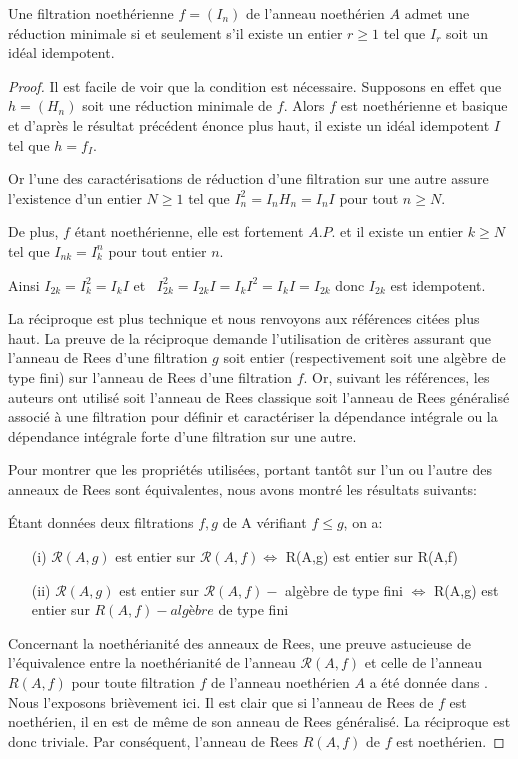 \begin{maproposition}
	Une filtration noethérienne $f=(I_{n})$ de l'anneau noethérien $A$
	admet une réduction minimale si et seulement s'il existe un entier $r\geq 1$ tel que $I_{r}$ soit un idéal idempotent.
\end{maproposition}
\begin{proof}
	Il est facile de voir que la condition est nécessaire. Supposons en effet que $h=(H_{n})$ soit une réduction minimale de $f$. Alors $f $ est noethérienne et basique et d'après le résultat précédent énonce plus haut, il existe un idéal idempotent $I$ tel que $h=f_{I}$. 
	
	Or l'une des caractérisations de réduction d'une filtration sur une
	autre assure l'existence d'un entier $N\geq 1$ tel que $I_{n}^{2}=I_{n}H_{n}=I_{n}I$ pour tout $n\geq N$. 
	
	De plus, $f$ étant noethérienne, elle est fortement $A.P.$ et il
	existe un entier $k\geq N$ tel que $I_{nk}=I_{k}^{n}$ pour tout entier $n$. 
	
	Ainsi $I_{2k}=I_{k}^{2}=I_{k}I$ et \ $I_{2k}^{2}=I_{2k}I=I_{k}I^{2}=I_{k}I=I_{2k}$ donc $I_{2k}$ est idempotent.
	
	La réciproque est plus technique et nous renvoyons aux références citées plus haut. La preuve de la réciproque demande
	l'utilisation de critères assurant que l'anneau de Rees d'une filtration $g$ soit entier (respectivement soit une algèbre de type fini) sur l'anneau de Rees d'une filtration $f.$ Or, suivant les références, les auteurs ont utilisé soit l'anneau de Rees classique soit l'anneau de Rees généralisé associé à une filtration pour définir et caractériser la dépendance intégrale ou la dépendance intégrale forte d'une filtration sur une autre. 
	
	Pour montrer que les propriétés utilisées, portant tantôt sur l'un ou l'autre des anneaux de
	Rees sont équivalentes, nous avons montré les résultats suivants:
	
	Étant données deux filtrations $f,g$ de A vérifiant $f\leq g$, on a:
	\begin{enumerate}
		\item[(i)]  $\mathcal{R}(A,g)$ est entier sur $\mathcal{R}(A,f)\Longleftrightarrow $ R(A,g) est entier
		sur R(A,f)
		\item[(ii)] $\mathcal{R}(A,g)$ est entier sur $\mathcal{R}(A,f)-$ algèbre de type fini $\Longleftrightarrow $ R(A,g) est entier sur $R(A,f)-algèbre$ de type fini
	\end{enumerate}
	Concernant la noethérianité des anneaux de Rees, une preuve astucieuse de l'équivalence entre la noethérianité de l'anneau $\mathcal{R}(A,f)$ et celle de l'anneau $R(A,f)$ pour toute filtration $f$ de l'anneau noethérien $A$ a été donnée dans \cite{6}. Nous l'exposons brièvement ici. Il est clair que si l'anneau de Rees de $f$ est noethérien, il en est de m\^{e}me de son anneau de Rees généralisé. La réciproque est donc triviale. Par conséquent, l'anneau de Rees $R(A,f)$ de $f$ est noethérien.
	
\end{proof}



